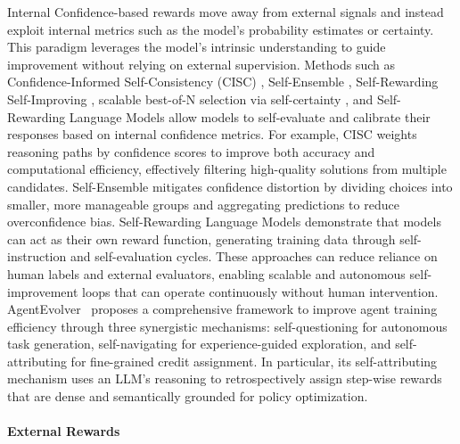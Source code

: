 \documentclass[10pt]{article} %
\begin{document}
Internal Confidence-based rewards move away from external signals and instead exploit internal metrics such as the model’s probability estimates or certainty. This paradigm leverages the model's intrinsic understanding to guide improvement without relying on external supervision. Methods such as Confidence-Informed Self-Consistency (CISC) \citep{taubenfeld2025cisc}, Self-Ensemble \citep{xu2025selfensemblemitigatingconfidencedistortion}, Self-Rewarding Self-Improving \citep{simonds2025selfrewardingselfimproving}, scalable best-of-N selection via self-certainty \citep{kang2025scalablebestofnselectionlarge}, and Self-Rewarding Language Models \citep{yuan2025selfrewardinglanguagemodels} allow models to self-evaluate and calibrate their responses based on internal confidence metrics. For example, CISC weights reasoning paths by confidence scores to improve both accuracy and computational efficiency, effectively filtering high-quality solutions from multiple candidates. Self-Ensemble mitigates confidence distortion by dividing choices into smaller, more manageable groups and aggregating predictions to reduce overconfidence bias. Self-Rewarding Language Models demonstrate that models can act as their own reward function, generating training data through self-instruction and self-evaluation cycles. These approaches can reduce reliance on human labels and external evaluators, enabling scalable and autonomous self-improvement loops that can operate continuously without human intervention. AgentEvolver~\citep{zhai2025agentevolver} proposes a comprehensive framework to improve agent training efficiency through three synergistic mechanisms: self-questioning for autonomous task generation, self-navigating for experience-guided exploration, and self-attributing for fine-grained credit assignment. In particular, its self-attributing mechanism uses an LLM's reasoning to retrospectively assign step-wise rewards that are dense and semantically grounded for policy optimization.

\paragraph{External Rewards}
\end{document}
